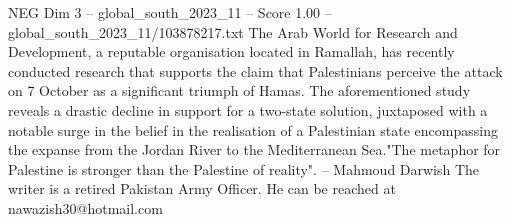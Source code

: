 \begin{textsample}{NEG Dim 3 – global\_south\_2023\_11 – Score 1.00 – global\_south\_2023\_11/103878217.txt}
The Arab World for Research and Development, a reputable organisation located in Ramallah, has recently conducted research that supports the claim that Palestinians perceive the attack on 7 October as a significant triumph of Hamas.
The aforementioned study reveals a drastic decline in support for a two-state solution, juxtaposed with a notable surge in the belief in the realisation of a Palestinian state encompassing the expanse from the Jordan River to the Mediterranean Sea."The metaphor for Palestine is stronger than the Palestine of reality". -- Mahmoud Darwish The writer is a retired Pakistan Army Officer.
He can be reached at nawazish30@hotmail.com

\end{textsample}

